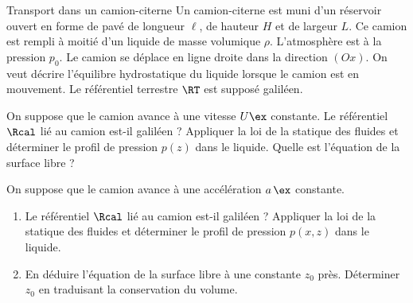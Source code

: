 \begin{exo}[PC][1][colle]{Transport dans un camion-citerne}
Un camion-citerne est muni d'un réservoir ouvert en forme de pavé de longueur $\ell$, de hauteur $H$ et de largeur $L$. Ce camion est rempli à moitié d'un liquide de masse volumique $\rho$. L'atmosphère est à la pression $p_0$. Le camion se déplace en ligne droite dans la direction $(Ox)$. On veut décrire l'équilibre hydrostatique du liquide lorsque le camion est en mouvement. Le référentiel terrestre $\RT$ est supposé galiléen.

\begin{quest}
\item On suppose que le camion avance à une vitesse $U\ex$ constante. Le référentiel $\Rcal$ lié au camion est-il galiléen ? Appliquer la loi de la statique des fluides et déterminer le profil de pression $p(z)$ dans le liquide. Quelle est l'équation de la surface libre ?
\item  On suppose que le camion avance à une accélération $a\,\ex$ constante.
\begin{enumerate}
  \item  Le référentiel $\Rcal$ lié au camion est-il galiléen ? Appliquer la loi de la statique des fluides et déterminer le profil de pression $p(x,z)$ dans le liquide.

      
      \item En déduire l'équation de la surface libre à une constante  $z_0$ près. Déterminer $z_0$ en traduisant la conservation du volume.
      

\end{enumerate}
\end{quest}
\end{exo}
